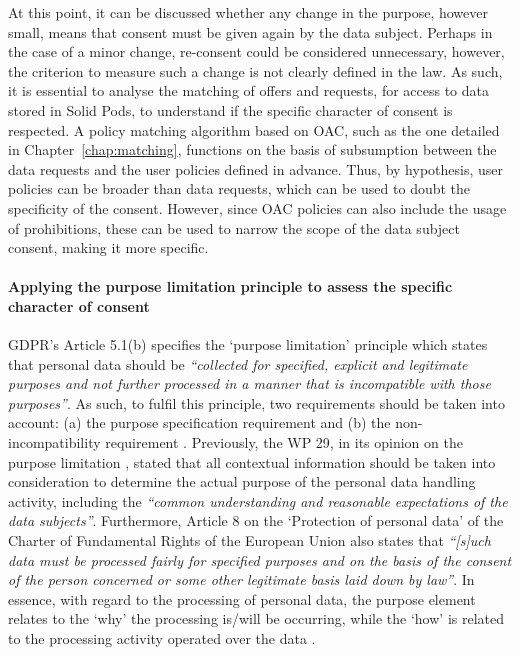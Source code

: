 At this point, it can be discussed whether any change in the purpose, however small, means that consent must be given again by the data subject.
Perhaps in the case of a minor change, re-consent could be considered unnecessary, however, the criterion to measure such a change is not clearly defined in the law. 
As such, it is essential to analyse the matching of offers and requests, for access to data stored in Solid Pods, to understand if the specific character of consent is respected.
A policy matching algorithm based on OAC, such as the one detailed in Chapter~\ref{chap:matching}, functions on the basis of subsumption between the data requests and the user policies defined in advance.
Thus, by hypothesis, user policies can be broader than data requests, which can be used to doubt the specificity of the consent.
However, since OAC policies can also include the usage of prohibitions, these can be used to narrow the scope of the data subject consent, making it more specific.


\paragraph{Applying the purpose limitation principle to assess the specific character of consent}

GDPR's Article 5.1(b) \citeyearpar{noauthor_regulation_2016} specifies the `purpose limitation' principle which states that personal data should be \textit{``collected for specified, explicit and legitimate purposes and not further processed in a manner that is incompatible with those purposes''}.
As such, to fulfil this principle, two requirements should be taken into account: (a) the purpose specification requirement and (b) the non-incompatibility requirement \citep{koning_purpose_2020}. 
Previously, the WP 29, in its opinion on the purpose limitation \citep{article_29_data_protection_working_party_opinion_2013}, stated that all contextual information should be taken into consideration to determine the actual purpose of the personal data handling activity, including the \textit{``common understanding and
reasonable expectations of the data subjects''}.
Furthermore, Article 8 on the `Protection of personal data' of the Charter of Fundamental Rights of the European Union \citeyearpar{noauthor_charter_2000} also states that \textit{``[s]uch data must be processed fairly for specified purposes and on the basis of the consent of the person concerned or some other legitimate basis laid down by law''}.
In essence, with regard to the processing of personal data, the purpose element relates to the `why' the processing is/will be occurring, while the `how' is related to the processing activity operated over the data \citep{koning_purpose_2020}.

